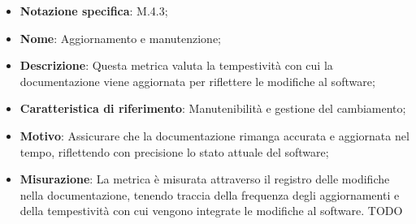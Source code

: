 \begin{itemize}
    \item \textbf{Notazione specifica}: M.4.3;
    \item \textbf{Nome}: Aggiornamento e manutenzione;
    \item \textbf{Descrizione}: Questa metrica valuta la tempestività con cui la documentazione viene aggiornata per riflettere le modifiche al software;
    \item \textbf{Caratteristica di riferimento}: Manutenibilità e gestione del cambiamento;
    \item \textbf{Motivo}: Assicurare che la documentazione rimanga accurata e aggiornata nel tempo, riflettendo con precisione lo stato attuale del software;
    \item \textbf{Misurazione}: La metrica è misurata attraverso il registro delle modifiche nella documentazione, tenendo traccia della frequenza degli aggiornamenti e della tempestività con cui vengono integrate le modifiche al software.
    TODO
    
\end{itemize}
